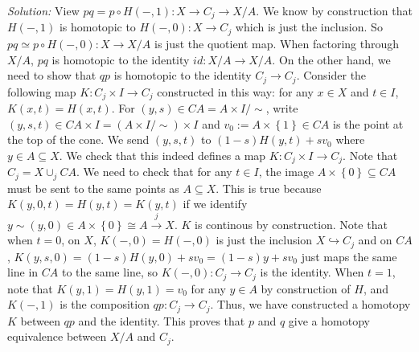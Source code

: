 \documentclass[a4paper, 12pt]{article}
\newenvironment{solution}
    {\textit{Solution:}}
    {}
\begin{document}
\begin{solution}
View \(pq=p\circ H(-,1):X\rightarrow C_j\rightarrow X/A\). We know by construction that \(H(-,1)\) is homotopic to \(H(-,0):X\rightarrow C_j\) which is just the inclusion. So \(pq\simeq p\circ H(-,0):X\rightarrow X/A\) is just the quotient map. When 
factoring through \(X/A\), \(pq\) is homotopic to the identity \(id:X/A\rightarrow X/A\). On the other hand, we need to show that \(qp\) is homotopic to the identity \(C_j\rightarrow C_j\). Consider the following map \(K:C_j\times I\rightarrow C_j\) constructed in this way: 
for any \(x\in X\) and \(t\in I\), \(K(x,t)=H(x,t)\). For \((y,s)\in CA=A\times I/\sim\), write \((y,s,t)\in CA\times I=(A\times I/\sim)\times I\) and \(v_0:=A\times \left\{ 1 \right\}\in CA\) is the point at the top of the cone. 
We send \((y,s,t)\) to \((1-s)H(y,t)+sv_0\) where \(y\in A\subseteq X\). We check that this indeed defines a map \(K:C_j\times I\rightarrow C_j\). Note that \(C_j=X\cup_j CA\). We need to check that for any \(t\in I\), the image \(A\times \left\{ 0 \right\}\subseteq CA\) must be sent to the 
same points as \(A\subseteq X\). This is true because \(K(y,0,t)=H(y,t)=K(y,t)\) if we identify  \(y\sim (y,0)\in A\times \left\{ 0 \right\}\cong A\xrightarrow{j}X\). \(K\) is continous by construction. Note that when \(t=0\), on \(X\), \(K(-,0)=H(-,0)\) is just the inclusion \(X\hookrightarrow C_j\) and 
on \(CA\), \(K(y,s,0)=(1-s)H(y,0)+sv_0=(1-s)y+sv_0\) just maps the same line in \(CA\) to the same line, so \(K(-,0):C_j\rightarrow C_j\) is the identity. When \(t=1\), note that \(K(y,1)=H(y,1)=v_0\) for any \(y\in A\) by construction of \(H\), and \(K(-,1)\) is the composition \(qp:C_j\rightarrow C_j\). Thus, 
we have constructed a homotopy \(K\) between \(qp\) and the identity. This proves that \(p\) and \(q\) give a homotopy equivalence between \(X/A\) and \(C_j\).
\end{solution}
\end{document}
